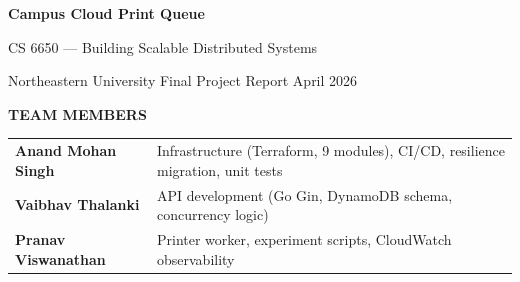 \documentclass[11pt,letterpaper]{article}
\begin{document}
\begin{titlepage}
\thispagestyle{empty}
\noindent
{}

\vspace*{0.9cm}
{\color{white}\fontsize{28}{34}\selectfont\bfseries Campus Cloud Print Queue\par}
\vspace{0.25cm}
{\color{accent!70!white}\fontsize{13}{20}\selectfont
  CS 6650 --- Building Scalable Distributed Systems\par}
\vspace{0.15cm}
{\color{white!75!primary}\normalsize
  Northeastern University \textperiodcentered{}
  Final Project Report \textperiodcentered{}
  April 2026\par}

\vspace{1.6cm}

\begin{tcolorbox}[
  colback=surface,
  colframe=border,
  boxrule=0.8pt,
  arc=4pt,
  width=1.0\textwidth,
  left=14pt, right=14pt, top=10pt, bottom=10pt,
]
  {\small\bfseries\color{muted}\MakeUppercase{Team Members}\par}
  \vspace{6pt}
  \begin{tabularx}{\linewidth}{@{}lX@{}}
    \textbf{Anand Mohan Singh}    & Infrastructure (Terraform, 9 modules), CI/CD, resilience migration, unit tests \\[3pt]
    \textbf{Vaibhav Thalanki}     & API development (Go Gin, DynamoDB schema, concurrency logic) \\[3pt]
    \textbf{Pranav Viswanathan}   & Printer worker, experiment scripts, CloudWatch observability \\
  \end{tabularx}
\end{tcolorbox}

\vspace{0.8cm}


\end{titlepage}
\end{document}
